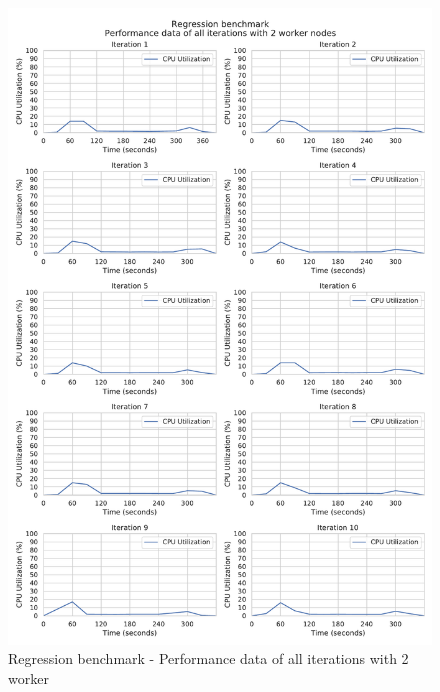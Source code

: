\begin{figure}[h]
\centering
\includegraphics[scale=0.5]{images/appendix/evaluation_data/regression_benchmark/regression_2_worker_cpu_performance}
\caption{Regression benchmark - Performance data of all iterations with 2 worker}
\label{fig:appendix_eval_regression_static2}
\end{figure}

